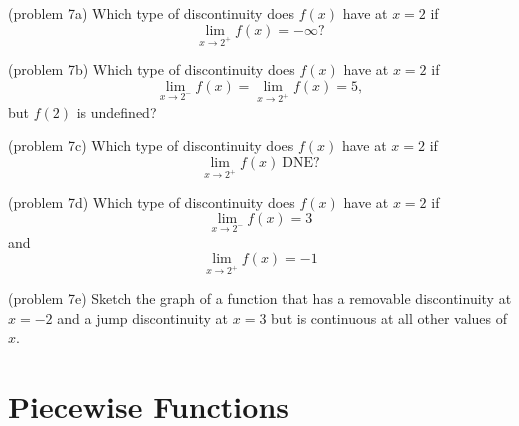\documentclass[handout]{ximera}
\begin{document}

\begin{problem}(problem 7a)
Which type of discontinuity does $f(x)$ have at $x=2$ if
\[
\lim_{x \to 2^+} f(x) = -\infty?
\]

\begin{multipleChoice}
\end{multipleChoice}
\end{problem}

\begin{problem}(problem 7b)
Which type of discontinuity does $f(x)$ have at $x=2$ if
\[
\lim_{x \to 2^-} f(x) = \lim_{x \to 2^+} f(x) = 5,
\]
but $f(2)$ is undefined?
\begin{multipleChoice}
\end{multipleChoice}
\end{problem}

\begin{problem}(problem 7c)
Which type of discontinuity does $f(x)$ have at $x=2$ if
\[
\lim_{x \to 2^+} f(x) \ \text{DNE}?
\]

\begin{multipleChoice}
\end{multipleChoice}
\end{problem}

\begin{problem}(problem 7d)
Which type of discontinuity does $f(x)$ have at $x=2$ if
\[
\lim_{x \to 2^-} f(x) = 3
\]
and
\[
\lim_{x \to 2^+} f(x) = -1
\]
\begin{multipleChoice}
\end{multipleChoice}
\end{problem}

\begin{problem}(problem 7e)
Sketch the graph of a function that has a removable discontinuity at $x = -2$ and a jump discontinuity at $x = 3$ but is continuous at all other values of $x$.
\end{problem}

\section{Piecewise Functions}
\end{document}
